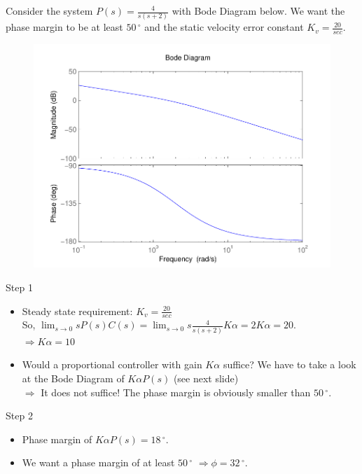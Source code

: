 \begin{frame}
\begin{example}
	Consider the system $P(s) = \frac{4}{s(s+2)}$ with Bode Diagram below. 
	\vspace{0.1 cm}
	We want the phase margin to be at least $50\,^{\circ}$ and the static velocity error constant $K_v = \frac{20}{sec}$.  
	\begin{figure}
		\centering
		\includegraphics[width=0.5
		\linewidth]{bodeexamplelead}
	\end{figure}
\end{example}
\end{frame}

\begin{frame}
\begin{exampleblock}{Step 1}
\begin{itemize}	
\item Steady state requirement: $K_v = \frac{20}{sec}$ \\
So, $\lim_{s \to 0} sP(s)C(s) = \lim_{s \to 0} s\frac{4}{s(s+2)}K\alpha = 2K\alpha = 20$. \\
$\Rightarrow K\alpha = 10$
\item Would a proportional controller with gain $K\alpha$ suffice? We have to take a look at the Bode Diagram of $K\alpha P(s)$ (see next slide) \\
$\Rightarrow$ It does not suffice! The phase margin is obviously smaller than $50\,^{\circ}$.
\end{itemize}
\end{exampleblock}
\begin{exampleblock}{Step 2}
	\begin{itemize}
	\item Phase margin of $K\alpha P(s) = 18\,^{\circ}$.
	\item We want a phase margin of at least $50\,^{\circ}$
	$\Rightarrow \phi = 32\,^{\circ}$.
	\end{itemize}
\end{exampleblock}
\end{frame}

